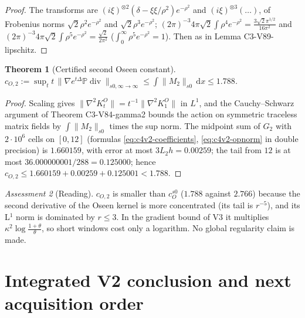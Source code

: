 \documentclass[11pt]{article}
\newcommand{\dd}{\,\mathrm d}
\newcommand{\PP}{\mathbb P}
\theoremstyle{plain}
\newtheorem{theorem}{Theorem}[section]
\theoremstyle{definition}
\theoremstyle{remark}
\newtheorem{assessment}[theorem]{Assessment}
\begin{document}
\begin{proof}
The transforms are \((i\xi)^{\otimes2}(\delta-\xi\xi/\rho^2)e^{-\rho^2}\) and \((i\xi)^{\otimes3}(\dots)\), of Frobenius
norms \(\sqrt2\rho^2e^{-\rho^2}\) and \(\sqrt2\rho^3e^{-\rho^2}\); \((2\pi)^{-3}4\pi\sqrt2\int\rho^4e^{-\rho^2}=\frac{3\sqrt2\pi^{1/2}}{16\pi^2}\)
and \((2\pi)^{-3}4\pi\sqrt2\int\rho^5e^{-\rho^2}=\frac{\sqrt2}{2\pi^2}\) (\(\int_0^\infty\rho^5e^{-\rho^2}=1\)).  Then as in
Lemma C3-V89-lipschitz.
\end{proof}

\begin{theorem}[Certified second Oseen constant]
\label{thm:c4v2-certified}
\(c_{O,2}:=\sup_tt\,\|\nabla e^{t\Delta}\PP\operatorname{div}\|_{s0,\infty\to\infty}\le\int\|M_2\|_{s0}\dd x\le1.788\).
\end{theorem}

\begin{proof}
Scaling gives \(\|\nabla^2K^O_t\|=t^{-1}\|\nabla^2K^O_1\|\) in \(L^1\), and the Cauchy--Schwarz
argument of Theorem C3-V84-gamma2 bounds the action on symmetric
traceless matrix fields by \(\int\|M_2\|_{s0}\) times the sup norm.  The
midpoint sum of \(G_2\) with \(2\cdot10^6\) cells on \([0,12]\) (formulas
\eqref{eq:c4v2-coefficients}, \eqref{eq:c4v2-opnorm} in double precision) is
\(1.660159\), with error at most \(3L_2h=0.00259\); the tail from \(12\) is at
most \(36.000000001/288=0.125000\); hence \(c_{O,2}\le1.660159+0.00259+0.125001<1.788\).
\end{proof}

\begin{assessment}[Reading]
\label{ass:c4v2-reading}
\(c_{O,2}\) is smaller than \(c_O^{s0}\) (\(1.788\) against \(2.766\)) because the second
derivative of the Oseen kernel is more concentrated (its tail is
\(r^{-5}\)), and its L\(^1\) norm is dominated by \(r\le3\).  In the gradient bound
of V3 it multiplies \(\kappa^2\log\frac{1+\theta}\theta\), so short windows cost only a
logarithm.  No global regularity claim is made.
\end{assessment}

\section{Integrated V2 conclusion and next acquisition order}
\label{sec:c4v2-conclusion}
\end{document}
